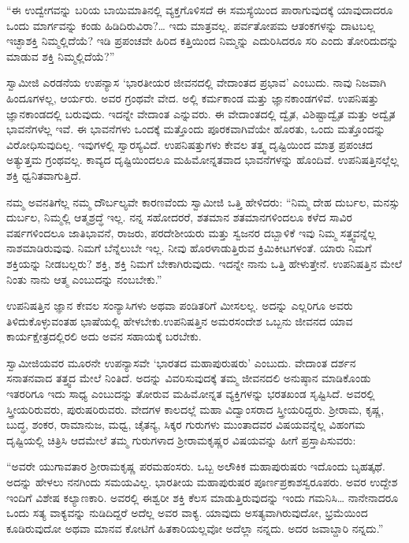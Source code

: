  “ಈ ಉದ್ವೇಗವನ್ನು ಬರಿಯ ಬಾಯಿಮಾತಿನಲ್ಲಿ ವ್ಯಕ್ತಗೊಳಿಸದೆ ಈ ಸಮಸ್ಯೆಯಿಂದ ಪಾರಾಗುವುದಕ್ಕೆ ಯಾವುದಾದರೂ ಒಂದು ಮಾರ್ಗವನ್ನು ಕಂಡು ಹಿಡಿದಿರುವಿರಾ?… ಇದು ಮಾತ್ರವಲ್ಲ. ಪರ್ವತೋಪಮ ಆತಂಕಗಳನ್ನು ದಾಟಬಲ್ಲ ಇಚ್ಛಾಶಕ್ತಿ ನಿಮ್ಮಲ್ಲಿದೆಯೆ? ಇಡಿ ಪ್ರಪಂಚವೇ ಹಿರಿದ ಕತ್ತಿಯಿಂದ ನಿಮ್ಮನ್ನು ಎದುರಿಸಿದರೂ ಸರಿ ಎಂದು ತೋರಿದುದನ್ನು ಮಾಡುವ ಶಕ್ತಿ ನಿಮ್ಮಲ್ಲಿದೆಯೆ?” 

 ಸ್ವಾಮೀಜಿ ಎರಡನೆಯ ಉಪನ್ಯಾಸ ‘ಭಾರತೀಯರ ಜೀವನದಲ್ಲಿ ವೇದಾಂತದ ಪ್ರಭಾವ’ ಎಂಬುದು. ನಾವು ನಿಜವಾಗಿ ಹಿಂದೂಗಳಲ್ಲ, ಆರ್ಯರು. ಅವರ ಗ್ರಂಥವೇ ವೇದ. ಅಲ್ಲಿ ಕರ್ಮಕಾಂಡ ಮತ್ತು ಜ್ಞಾನಕಾಂಡಗಳಿವೆ. ಉಪನಿಷತ್ತು ಜ್ಞಾನಕಾಂಡದಲ್ಲಿ ಬರುವುದು. ಇದನ್ನೇ ವೇದಾಂತ ಎನ್ನುವರು. ಈ ವೇದಾಂತದಲ್ಲಿ ದ್ವೈತ, ವಿಶಿಷ್ಟಾದ್ವೈತ ಮತ್ತು ಅದ್ವೈತ ಭಾವನೆಗಳೆಲ್ಲ ಇವೆ. ಈ ಭಾವನೆಗಳು ಒಂದಕ್ಕೆ ಮತ್ತೊಂದು ಪೂರಕವಾಗಿವೆಯೇ ಹೊರತು, ಒಂದು ಮತ್ತೊಂದನ್ನು ವಿರೋಧಿಸುವುದಿಲ್ಲ. ಇವುಗಳಲ್ಲಿ ಸ್ವಾರಸ್ಯವಿದೆ. ಉಪನಿಷತ್ತುಗಳು ಕೇವಲ ತತ್ತ್ವ ದೃಷ್ಟಿಯಿಂದ ಮಾತ್ರ ಪ್ರಪಂಚದ ಅತ್ಯುತ್ತಮ ಗ್ರಂಥವಲ್ಲ. ಕಾವ್ಯದ ದೃಷ್ಟಿಯಿಂದಲೂ ಮಹಿಮೋನ್ನತವಾದ ಭಾವನೆಗಳನ್ನು ಹೊಂದಿವೆ. ಉಪನಿಷತ್ತಿನಲ್ಲೆಲ್ಲ ಶಕ್ತಿ ಧ್ವನಿತವಾಗುತ್ತಿದೆ. 

 ನಮ್ಮ ಅವನತಿಗೆಲ್ಲ ನಮ್ಮ ದೌರ್ಬಲ್ಯವೇ ಕಾರಣವೆಂದು ಸ್ವಾಮೀಜಿ ಒತ್ತಿ ಹೇಳಿದರು: “ನಿಮ್ಮ ದೇಹ ದುರ್ಬಲ, ಮನಸ್ಸು ದುರ್ಬಲ, ನಿಮ್ಮಲ್ಲಿ ಆತ್ಮಶ್ರದ್ಧೆ ಇಲ್ಲ. ನನ್ನ ಸಹೋದರರೆ, ಶತಮಾನ ಶತಮಾನಗಳಿಂದಲೂ ಕಳೆದ ಸಾವಿರ ವರ್ಷಗಳಿಂದಲೂ ಜಾತಿಭಾವನೆ, ರಾಜರು, ಪರದೇಶೀಯರು ಮತ್ತು ಸ್ವಜನರ ದಬ್ಬಾಳಿಕೆ ಇವು ನಿಮ್ಮ ಸತ್ತ್ವವನ್ನೆಲ್ಲ ನಾಶಮಾಡಿರುವುವು. ನಿಮಗೆ ಬೆನ್ನೆಲುಬೇ ಇಲ್ಲ. ನೀವು ಹೊರಳಾಡುತ್ತಿರುವ ಕ್ರಿಮಿಕೀಟಗಳಂತೆ. ಯಾರು ನಿಮಗೆ ಶಕ್ತಿಯನ್ನು ನೀಡಬಲ್ಲರು? ಶಕ್ತಿ, ಶಕ್ತಿ ನಿಮಗೆ ಬೇಕಾಗಿರುವುದು. ಇದನ್ನೇ ನಾನು ಒತ್ತಿ ಹೇಳುತ್ತೇನೆ. ಉಪನಿಷತ್ತಿನ ಮೇಲೆ ನಿಂತು ನಾನು ಆತ್ಮ ಎಂಬುದನ್ನು ನಂಬಬೇಕು.” 

 ಉಪನಿಷತ್ತಿನ ಜ್ಞಾನ ಕೇವಲ ಸಂನ್ಯಾಸಿಗಳು ಅಥವಾ ಪಂಡಿತರಿಗೆ ಮೀಸಲಲ್ಲ. ಅದನ್ನು ಎಲ್ಲರಿಗೂ ಅವರು ತಿಳಿದುಕೊಳ್ಳುವಂತಹ ಭಾಷೆಯಲ್ಲಿ ಹೇಳಬೇಕು.\break ಉಪನಿಷತ್ತಿನ ಅಮರಸಂದೇಶ ಒಬ್ಬನು ಜೀವನದ ಯಾವ ಕಾರ್ಯಕ್ಷೇತ್ರದಲ್ಲಿರಲಿ ಅದು ಅವನ ಸಹಾಯಕ್ಕೆ ಬರಬೇಕು. 

 ಸ್ವಾಮೀಜಿಯವರ ಮೂರನೇ ಉಪನ್ಯಾಸವೇ ‘ಭಾರತದ ಮಹಾಪುರುಷರು’ ಎಂಬುದು. ವೇದಾಂತ ದರ್ಶನ ಸನಾತನವಾದ ತತ್ತ್ವದ ಮೇಲೆ ನಿಂತಿದೆ. ಅದನ್ನು ವಿವರಿಸುವುದಕ್ಕೆ ತಮ್ಮ ಜೀವನದಲಿ ಅನುಷ್ಠಾನ ಮಾಡಿಕೊಂಡು ಇತರರಿಗೂ ಇದು ಸಾಧ್ಯ ಎಂಬುದನ್ನು ತೋರುವ ಮಹಿಮೋನ್ನತ ವ್ಯಕ್ತಿಗಳನ್ನು ಭರತಖಂಡ ಸೃಷ್ಟಿಸಿದೆ. ಅವರಲ್ಲಿ ಸ್ತ್ರೀಯರಿರುವರು, ಪುರುಷರಿರುವರು. ವೇದಗಳ ಕಾಲದಲ್ಲೆ ಮಹಾ ವಿದ್ವಾಂಸರಾದ ಸ್ತ್ರೀಯರಿದ್ದರು. ಶ‍್ರೀರಾಮ, ಕೃಷ್ಣ, ಬುದ್ಧ, ಶಂಕರ, ರಾಮಾನುಜ, ಮಧ್ವ, ಚೈತನ್ಯ, ಸಿಕ್ಕರ ಗುರುಗಳು ಮುಂತಾದವರ ವಿಷಯವನ್ನೆಲ್ಲ ವಿಹಂಗಮ ದೃಷ್ಟಿಯಲ್ಲಿ ಚಿತ್ರಿಸಿ ಆದಮೇಲೆ ತಮ್ಮ ಗುರುಗಳಾದ ಶ‍್ರೀರಾಮಕೃಷ್ಣರ ವಿಷಯವನ್ನು ಹೀಗೆ ಪ್ರಸ್ತಾಪಿಸುವರು: 

 “ಅವರೇ ಯುಗಾವತಾರ ಶ‍್ರೀರಾಮಕೃಷ್ಣ ಪರಮಹಂಸರು. ಒಬ್ಬ ಅಲೌಕಿಕ ಮಹಾಪುರುಷರು ಇದೊಂದು ಬೃಹತ್ಕಥೆ. ಅದನ್ನು ಹೇಳಲು ನನಗಿಂದು ಸಮಯವಿಲ್ಲ. ಭಾರತೀಯ ಮಹಾಪುರುಷರ ಪೂರ್ಣಪ್ರಕಾಶಸ್ವರೂಪರು. ಅವರ ಉದ್ದೇಶ ಇಂದಿಗೆ ವಿಶೇಷ ಕಲ್ಯಾಣಕಾರಿ. ಅವರಲ್ಲಿ ಈಶ್ವರೀ ಶಕ್ತಿ ಕೆಲಸ ಮಾಡುತ್ತಿರುವುದನ್ನು ಇಂದು ಗಮನಿಸಿ… ನಾನೇನಾದರೂ ಒಂದು ಸತ್ಯ ವಾಕ್ಯವನ್ನು ನುಡಿದಿದ್ದರೆ ಅದೆಲ್ಲ ಅವರ ವಾಕ್ಯ. ಯಾವುದು ಅಸತ್ಯವಾಗಿರುವುದೋ, ಭ್ರಮೆಯಿಂದ ಕೂಡಿರುವುದೋ ಅಥವಾ ಮಾನವ ಕೋಟಿಗೆ ಹಿತಕಾರಿಯಲ್ಲವೋ ಅದೆಲ್ಲಾ ನನ್ನದು. ಅದರ ಜವಾಬ್ದಾರಿ ನನ್ನದು.” 

